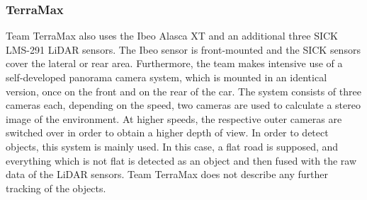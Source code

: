 \documentclass[11pt,oneside,openright]{mpreport}
\begin{document}
\subsubsection{TerraMax}
Team TerraMax \cite{Corp2005} also uses the Ibeo Alasca XT and an additional three SICK LMS-291 LiDAR sensors. The Ibeo sensor is front-mounted and the SICK sensors 
cover the lateral or rear area. Furthermore, the team makes intensive use of a self-developed panorama camera system, which is mounted in an identical version, once
on the front and on the rear of the car. The system consists of three cameras each, depending on the speed, two cameras are used to calculate a stereo image of the environment.
At higher speeds, the respective outer cameras are switched over in order to obtain a higher depth of view. In order to detect objects, this system is mainly used.
In this case, a flat road is supposed, and everything which is not flat is detected as an object and then fused with the raw data of the LiDAR sensors. 
Team TerraMax does not describe any further tracking of the objects.
\end{document}
